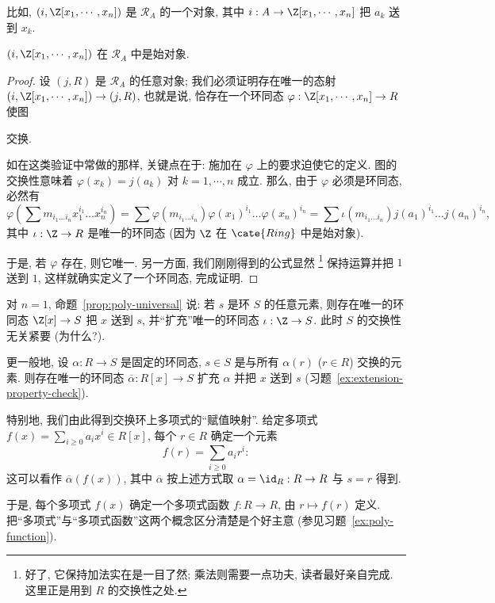 比如, $(i, \Z[x_1, \cdots, x_n])$ 是 $\mathscr{R}_A$ 的一个对象, 其中 $i : A \to \Z[x_1, \cdots, x_n]$ 把 $a_k$ 送到 $x_k$.

\begin{proposition}
\label{prop:poly-universal}
$(i, \Z[x_1, \cdots, x_n])$ 在 $\mathscr{R}_A$ 中是始对象.
\end{proposition}

\begin{proof}
设 $(j, R)$ 是 $\mathscr{R}_A$ 的任意对象; 我们必须证明存在唯一的态射 $(i, \Z[x_1, \cdots, x_n]) \to (j, R)$, 也就是说, 恰存在一个环同态 $\varphi : \Z[x_1, \cdots, x_n] \to R$ 使图
\begin{center}
\end{center}
交换.

如在这类验证中常做的那样, 关键点在于: 施加在 $\varphi$ 上的要求迫使它的定义. 图的交换性意味着 $\varphi(x_k) = j(a_k)$ 对 $k = 1, \cdots, n$ 成立. 那么, 由于 $\varphi$ 必须是环同态, 必然有
\[
\varphi\left(\sum m_{i_1 \dots i_n} x_1^{i_1} \dots x_n^{i_n}\right) = \sum \varphi(m_{i_1 \dots i_n}) \varphi(x_1)^{i_1} \dots \varphi(x_n)^{i_n} = \sum \iota(m_{i_1 \dots i_n}) j(a_1)^{i_1} \dots j(a_n)^{i_n},
\]
其中 $\iota : \Z \to R$ 是唯一的环同态 (因为 $\Z$ 在 $\cate{Ring}$ 中是始对象).

于是, 若 $\varphi$ 存在, 则它唯一. 另一方面, 我们刚刚得到的公式显然%
\footnote{好了, 它保持加法实在是一目了然; 乘法则需要一点功夫, 读者最好亲自完成. 这里正是用到 $R$ 的交换性之处.}%
保持运算并把 $1$ 送到 $1$, 这样就确实定义了一个环同态, 完成证明.
\end{proof}

\begin{example}
\label{ex:eval-n1}
对 $n = 1$, 命题~\ref{prop:poly-universal} 说: 若 $s$ 是环 $S$ 的任意元素, 则存在唯一的环同态 $\Z[x] \to S$ 把 $x$ 送到 $s$, 并``扩充''唯一的环同态 $\iota : \Z \to S$. 此时 $S$ 的交换性无关紧要 (为什么?).
\end{example}

\begin{example}
\label{ex:extension-property}
更一般地, 设 $\alpha : R \to S$ 是固定的环同态, $s \in S$ 是与所有 $\alpha(r)$ ($r \in R$) 交换的元素. 则存在唯一的环同态 $\overline{\alpha} : R[x] \to S$ 扩充 $\alpha$ 并把 $x$ 送到 $s$ (习题~\ref{ex:extension-property-check}).

特别地, 我们由此得到交换环上多项式的``赋值映射''. 给定多项式 $f(x) = \sum_{i \geq 0} a_i x^i \in R[x]$, 每个 $r \in R$ 确定一个元素
\[
f(r) = \sum_{i \geq 0} a_i r^i:
\]
这可以看作 $\overline{\alpha}(f(x))$, 其中 $\overline{\alpha}$ 按上述方式取 $\alpha = \id_R : R \to R$ 与 $s = r$ 得到.

于是, 每个多项式 $f(x)$ 确定一个多项式函数%
$f : R \to R$, 由 $r \mapsto f(r)$ 定义. 把``多项式''与``多项式函数''这两个概念区分清楚是个好主意 (参见习题~\ref{ex:poly-function}).
\end{example}

